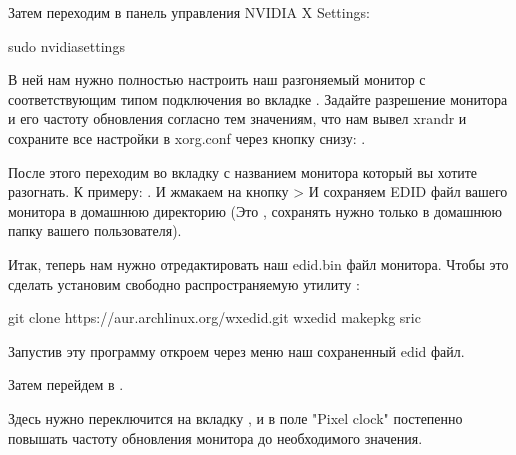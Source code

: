 \documentclass[letterpaper,10pt,russian,openany]{sphinxmanual}
\begin{document}
\sphinxAtStartPar
Затем переходим в панель управления NVIDIA X Settings:

\begin{sphinxVerbatim}[commandchars=\\\{\}]
sudo nvidia\PYGZhy{}settings
\end{sphinxVerbatim}

\sphinxAtStartPar
В ней нам нужно полностью настроить наш разгоняемый монитор с соответствующим типом подключения во вкладке  .
Задайте разрешение монитора и его частоту обновления согласно тем значениям,
что нам вывел xrandr и сохраните все настройки в xorg.conf через кнопку снизу: .

\sphinxAtStartPar
После этого переходим во вкладку с названием монитора который вы хотите разогнать.
К примеру: . И жмакаем на кнопку  \sphinxhyphen{}>
И сохраняем EDID файл вашего монитора в домашнюю директорию (Это , сохранять нужно только в домашнюю папку вашего пользователя).

\sphinxAtStartPar
Итак, теперь нам нужно отредактировать наш edid.bin файл монитора.
Чтобы это сделать установим свободно распространяемую утилиту :

\begin{sphinxVerbatim}[commandchars=\\\{\}]
git clone https://aur.archlinux.org/wxedid.git 
 wxedid                                      
makepkg \PYGZhy{}sric                                  
\end{sphinxVerbatim}

\sphinxAtStartPar
Запустив эту программу откроем через меню наш сохраненный edid файл.

\noindent{}

\sphinxAtStartPar
Затем перейдем в .

\noindent{}

\sphinxAtStartPar
Здесь нужно переключится на вкладку ,
и в поле "Pixel clock" постепенно повышать частоту обновления монитора до необходимого значения.
\end{document}
